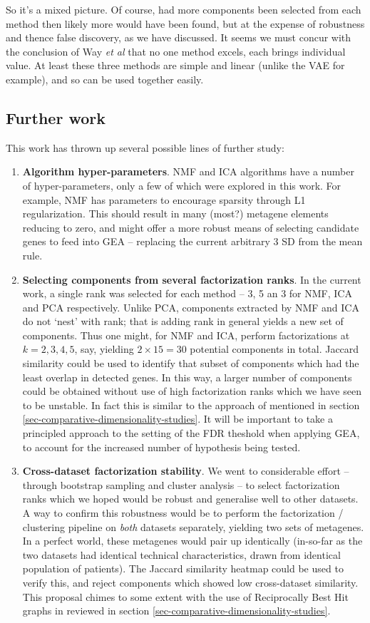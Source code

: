 \documentclass[tikz, 12pt,a4paper,oneside,fleqn]{article}
\newcommand{\etal}{{\em et al\/}}
\begin{document}
So it's a mixed picture.  Of course, had more components been selected from each method then likely more would have been found, but at the expense of robustness and thence false discovery, as we have discussed.   It seems we must concur with the conclusion of Way \etal \cite{WayGregory2019} that no one method excels, each brings individual value.   At least these three methods are simple and linear (unlike the VAE for example), and so can be used together easily.


\subsection{Further work}

This work has thrown up several possible lines of further study:
\begin{enumerate}
\item
{\bf Algorithm hyper-parameters}.  NMF and ICA algorithms have a number of hyper-parameters, only a few of which were explored in this work.  For example, NMF has parameters to encourage sparsity through L1 regularization.   This should result in many (most?) metagene elements reducing to zero, and might offer a more robust means of selecting candidate genes to feed into GEA -- replacing the current arbitrary 3 SD from the mean rule.
\item
{\bf Selecting components from several factorization ranks}.
In the current work, a single rank was selected for each method -- 3, 5 an 3 for NMF, ICA and PCA respectively.  Unlike PCA, components extracted by NMF and ICA  do not `nest' with rank; that is adding rank in general yields a new set of components.  Thus one might, for NMF and ICA, perform factorizations at $k=2,3,4,5$, say, yielding $2 \times 15 = 30$ potential components in total.  Jaccard similarity could be used to identify that subset of components which had the least overlap in detected genes.   In this way, a larger number of components could be obtained without use of high factorization ranks which we have seen to be unstable.  In fact this is similar to the approach of \cite{WayGregory2019} mentioned in section \ref{sec-comparative-dimensionality-studies}.  It will be important to take a principled approach to the setting of the FDR theshold when applying GEA, to account for the increased number of hypothesis being tested.
\item
{\bf Cross-dataset factorization stability}.  We went to considerable effort -- through bootstrap sampling and cluster analysis -- to select factorization ranks which we hoped would be robust and generalise well to other datasets.   A way to confirm this robustness would be to perform the factorization / clustering pipeline on \emph{both} datasets separately, yielding two sets of metagenes.  In a perfect world, these metagenes would pair up identically (in-so-far as the two datasets had identical technical characteristics, drawn from identical population of patients).  The Jaccard similarity heatmap could be used to verify this, and reject components which showed low cross-dataset similarity.  This proposal chimes to some extent with the use of Reciprocally Best Hit graphs in \cite{Cantini2019} reviewed in section \ref{sec-comparative-dimensionality-studies}.  

\end{enumerate}
\end{document}
